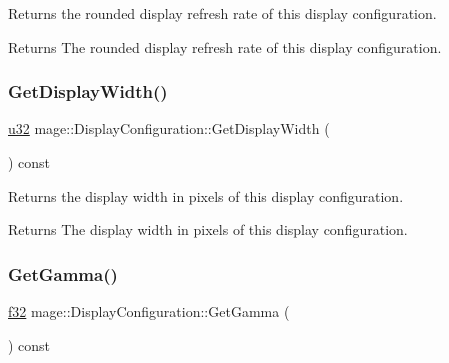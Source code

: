 Returns the rounded display refresh rate of this display configuration.

\begin{DoxyReturn}{Returns}
The rounded display refresh rate of this display configuration. 
\end{DoxyReturn}
\hypertarget{structmage_1_1_display_configuration_aa4a4e922d783b3211f75e34fbfd324b9}{}\label{structmage_1_1_display_configuration_aa4a4e922d783b3211f75e34fbfd324b9} 
\subsubsection{\texorpdfstring{Get\+Display\+Width()}{GetDisplayWidth()}}
{\footnotesize\ttfamily \hyperlink{namespacemage_af2b398bf98eb10351f49cad73fe2cc73}{u32} mage\+::\+Display\+Configuration\+::\+Get\+Display\+Width (\begin{DoxyParamCaption}{ }\end{DoxyParamCaption}) const\hspace{0.3cm}{\ttfamily [noexcept]}}

Returns the display width in pixels of this display configuration.

\begin{DoxyReturn}{Returns}
The display width in pixels of this display configuration. 
\end{DoxyReturn}
\hypertarget{structmage_1_1_display_configuration_a01e6d574b4fc99ef38f14061b7035963}{}\label{structmage_1_1_display_configuration_a01e6d574b4fc99ef38f14061b7035963} 
\subsubsection{\texorpdfstring{Get\+Gamma()}{GetGamma()}}
{\footnotesize\ttfamily \hyperlink{namespacemage_a6a44ad388483959dc4dff9f2aef91431}{f32} mage\+::\+Display\+Configuration\+::\+Get\+Gamma (\begin{DoxyParamCaption}{ }\end{DoxyParamCaption}) const\hspace{0.3cm}{\ttfamily [noexcept]}}


